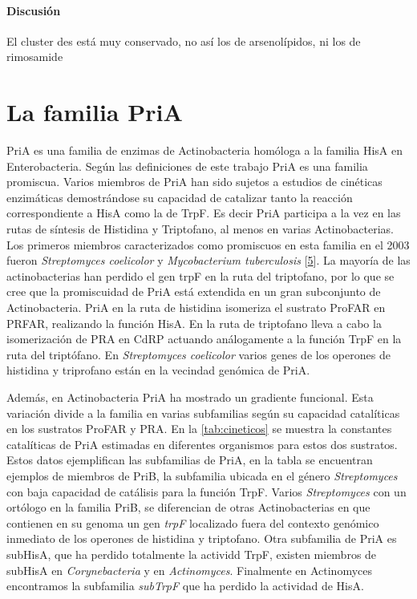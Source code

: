 \documentclass[12pt,twoside]{reedthesis}
\begin{document}
  \subsubsection{Discusión}\label{discusion}
  
  El cluster des está muy conservado, no así los de arsenolípidos, ni los
  de rimosamide
  
  \chapter{La familia PriA}\label{la-familia-pria}
  
  PriA es una familia de enzimas de Actinobacteria homóloga a la familia
  HisA en Enterobacteria. Según las definiciones de este trabajo PriA es
  una familia promiscua. Varios miembros de PriA han sido sujetos a
  estudios de cinéticas enzimáticas demostrándose su capacidad de
  catalizar tanto la reacción correspondiente a HisA como la de TrpF. Es
  decir PriA participa a la vez en las rutas de síntesis de Histidina y
  Triptofano, al menos en varias Actinobacterias. Los primeros miembros
  caracterizados como promiscuos en esta familia en el 2003 fueron
  \emph{Streptomyces coelicolor} y \emph{Mycobacterium tuberculosis}
  {[}\protect\hyperlink{ref-baronagomez_occurrence_2003}{5}{]}. La mayoría
  de las actinobacterias han perdido el gen trpF en la ruta del
  triptofano, por lo que se cree que la promiscuidad de PriA está
  extendida en un gran subconjunto de Actinobacteria. PriA en la ruta de
  histidina isomeriza el sustrato ProFAR en PRFAR, realizando la función
  HisA. En la ruta de triptofano lleva a cabo la isomerización de PRA en
  CdRP actuando análogamente a la función TrpF en la ruta del triptófano.
  En \emph{Streptomyces coelicolor} varios genes de los operones de
  histidina y triprofano están en la vecindad genómica de PriA.
  
  Además, en Actinobacteria PriA ha mostrado un gradiente funcional. Esta
  variación divide a la familia en varias subfamilias según su capacidad
  catalíticas en los sustratos ProFAR y PRA. En la \autoref{tab:cineticos}
  se muestra la constantes catalíticas de PriA estimadas en diferentes
  organismos para estos dos sustratos. Estos datos ejemplifican las
  subfamilias de PriA, en la tabla se encuentran ejemplos de miembros de
  PriB, la subfamilia ubicada en el género \emph{Streptomyces} con baja
  capacidad de catálisis para la función TrpF. Varios \emph{Streptomyces}
  con un ortólogo en la familia PriB, se diferencian de otras
  Actinobacterias en que contienen en su genoma un gen \emph{trpF}
  localizado fuera del contexto genómico inmediato de los operones de
  histidina y triptofano. Otra subfamilia de PriA es subHisA, que ha
  perdido totalmente la actividd TrpF, existen miembros de subHisA en
  \emph{Corynebacteria} y en \emph{Actinomyces}. Finalmente en Actinomyces
  encontramos la subfamilia \emph{subTrpF} que ha perdido la actividad de
  HisA.
  
\end{document}
